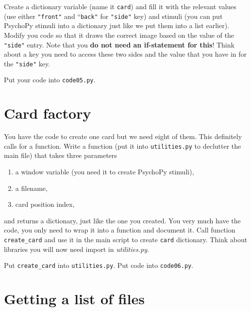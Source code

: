 \documentclass[
]{book}
\providecommand{\tightlist}{%
  \setlength{\itemsep}{0pt}\setlength{\parskip}{0pt}}
\begin{document}
Create a dictionary variable (name it \texttt{card}) and fill it with the relevant values (use either \texttt{"front"} and ``\texttt{back"} for \texttt{"side"} key) and stimuli (you can put PsychoPy stimuli into a dictionary just like we put them into a list earlier). Modify you code so that it draws the correct image based on the value of the \texttt{"side"} entry. Note that you \textbf{do not need an if-statement for this}! Think about a key you need to access these two sides and the value that you have in for the \texttt{"side"} key.

Put your code into \texttt{code05.py}.

\hypertarget{card-factory}{%
\section{Card factory}\label{card-factory}}

You have the code to create one card but we need eight of them. This definitely calls for a function. Write a function (put it into \texttt{utilities.py} to declutter the main file) that takes three parameters

\begin{enumerate}
\def\labelenumi{\arabic{enumi}.}
\tightlist
\item
  a window variable (you need it to create PsychoPy stimuli),
\item
  a filename,
\item
  card position index,
\end{enumerate}

and returns a dictionary, just like the one you created. You very much have the code, you only need to wrap it into a function and document it. Call function \texttt{create\_card} and use it in the main script to create \texttt{card} dictionary. Think about libraries you will now need import in \emph{utilities.py}.

Put \texttt{create\_card} into \texttt{utilities.py}.
Put code into \texttt{code06.py}.

\hypertarget{getting-a-list-of-files}{%
\section{Getting a list of files}\label{getting-a-list-of-files}}
\end{document}
